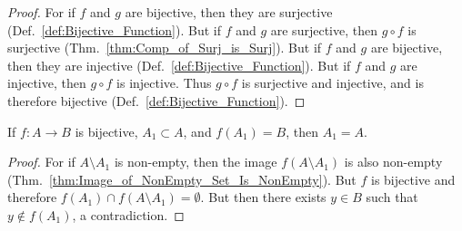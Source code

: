         \begin{proof}
            For if $f$ and $g$ are bijective, then they are surjective
            (Def.~\ref{def:Bijective_Function}). But if $f$ and $g$ are
            surjective, then $g\circ{f}$ is surjective
            (Thm.~\ref{thm:Comp_of_Surj_is_Surj}). But if $f$ and $g$ are
            bijective, then they are injective
            (Def.~\ref{def:Bijective_Function}). But if $f$ and $g$ are
            injective, then $g\circ{f}$ is injective. Thus $g\circ{f}$ is
            surjective and injective, and is therefore bijective
            (Def.~\ref{def:Bijective_Function}).
        \end{proof}
        \begin{theorem}
            If $f:A\rightarrow{B}$ is bijective, $A_{1}\subset{A}$, and
            $f(A_{1})=B$, then $A_{1}=A$.
        \end{theorem}
        \begin{proof}
            For if $A\setminus{A_{1}}$ is non-empty, then the image
            $f(A\setminus{A}_{1})$ is also non-empty
            (Thm.~\ref{thm:Image_of_NonEmpty_Set_Is_NonEmpty}). But $f$ is
            bijective and therefore
            $f(A_{1})\cap{f}(A\setminus{A}_{1})=\emptyset$. But then there
            exists $y\in{B}$ such that $y\notin{f}(A_1)$, a contradiction.
        \end{proof}
